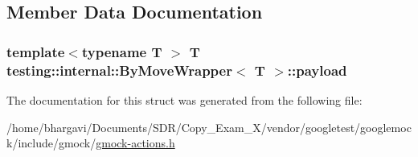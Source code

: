 \subsection{Member Data Documentation}
\subsubsection[{\texorpdfstring{payload}{payload}}]{\setlength{\rightskip}{0pt plus 5cm}template$<$typename T $>$ T {\bf testing\+::internal\+::\+By\+Move\+Wrapper}$<$ T $>$\+::payload}\hypertarget{structtesting_1_1internal_1_1_by_move_wrapper_ae8407b1ae99db3f00797d68b9ee9e870}{}\label{structtesting_1_1internal_1_1_by_move_wrapper_ae8407b1ae99db3f00797d68b9ee9e870}


The documentation for this struct was generated from the following file\+:\begin{DoxyCompactItemize}
\item 
/home/bhargavi/\+Documents/\+S\+D\+R/\+Copy\+\_\+\+Exam\+\_\+X/vendor/googletest/googlemock/include/gmock/\hyperlink{gmock-actions_8h}{gmock-\/actions.\+h}\end{DoxyCompactItemize}
